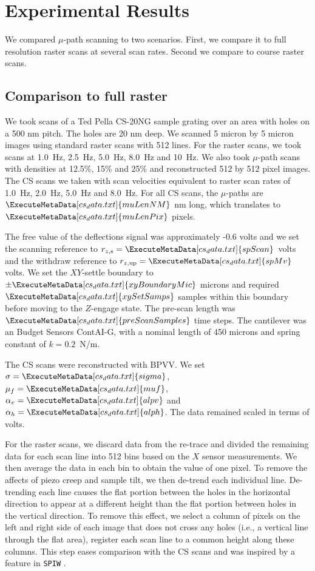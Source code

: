 \documentclass[twocolumn,oneside]{IEEEtran/IEEEtran}
\newcommand{\xc}{\ensuremath{X}\xspace}
\newcommand{\rzup}{\ensuremath{r_{z,\textrm{up}}}\xspace}
\newcommand{\rzs}{\ensuremath{r_{z,\textrm{s}}}\xspace}
\newcommand{\scanD}[1]{\ExecuteMetaData[cs_data.txt]{#1}}
\begin{document}
\section{Experimental Results}\label{sec:results}
We compared $\mu$-path scanning to two scenarios. First, we compare it to full resolution raster scans at several scan rates. Second we compare to course raster scans.

\subsection{Comparison to full raster}
We took scans of a Ted Pella CS-20NG sample grating over an area with holes on a 500 nm
pitch.
The holes are 20 nm deep.
We scanned 5 micron by 5 micron images using standard raster scans with 512 lines.
For the raster scans, we took scans at 1.0~Hz, 2.5~Hz, 5.0~Hz, 8.0~Hz and 10~Hz.
We also took $\mu$-path scans with densities at 12.5\%, 15\% and 25\% and reconstructed 512 by 512 pixel images. 
The CS scans we taken with scan velocities equivalent to raster scan rates of 1.0~Hz,
2.0~Hz, 5.0~Hz and 8.0~Hz. 
For all CS scans, the $\mu$-paths are $\scanD{muLenNM}$ nm long, which translates to $\scanD{muLenPix}$ pixels.

The free value of the deflections signal was approximately -0.6 volts and we set
the scanning reference to ${\rzs=\scanD{spScan}}$~volts and the withdraw reference to
${\rzup=\scanD{spMv}}$ volts. We set the $XY$-settle boundary to $\pm \scanD{xyBoundaryMic}$
microns and required $\scanD{xySetSamps}$ samples within this boundary before moving to the
$Z$-engage state. The pre-scan length was $\scanD{preScanSamples}$ time steps.
The cantilever was an Budget Sensors ContAI-G, with a nominal
length of 450 microns and spring constant of $k=0.2$~N/m.

The CS scans were reconstructed with BPVV. We set
${\sigma = \scanD{sigma}}$, ${\mu_f=\scanD{muf}}$, ${\alpha_v=\scanD{alpv}}$ and ${\alpha_h=\scanD{alph}}$. The data remained scaled in terms of volts.

For the raster scans, we discard data from the re-trace and divided the
remaining data for each scan line into 512 bins based on the \xc sensor
measurements. We then average the data in each bin to obtain the value of one
pixel. To remove the affects of piezo creep and sample tilt, we then de-trend
each individual line. De-trending each line causes the flat portion between the holes in the horizontal direction to appear at a different height than the flat portion between holes in the vertical direction. 
To remove this effect, we select a column of
pixels on the left and right side of each image that does not cross any holes
(i.e., a vertical line through the flat area), register each scan line to a
common height along these columns. This step eases comparison with the CS scans
and was inspired by a feature in \texttt{SPIW} \cite{spiw}.
\end{document}
